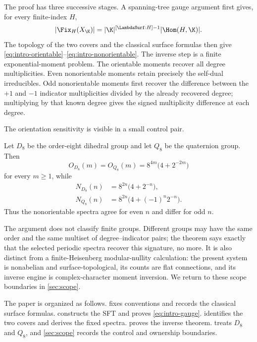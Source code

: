 The proof has three successive stages.  A spanning-tree gauge argument first
gives, for every finite-index $H$,
\begin{equation}
 |\Fix_H(X_{\K})|
 =|\K|^{[\LambdaSurf:H]-1}|\Hom(H,\K)|.
 \label{eq:intro-gauge}
\end{equation}
The topology of the two covers and the classical surface formulas then give
\eqref{eq:intro-orientable}--\eqref{eq:intro-nonorientable}.  The inverse step
is a finite exponential-moment problem.  The orientable moments recover all
degree multiplicities.  Even nonorientable moments retain precisely the
self-dual irreducibles.  Odd nonorientable moments first recover the difference
between the $+1$ and $-1$ indicator multiplicities divided by the already
recovered degree; multiplying by that known degree gives the signed
multiplicity difference at each degree.

The orientation sensitivity is visible in a small control pair.

\begin{corollary}
\label{cor:d8q8-intro}
Let $D_8$ be the order-eight dihedral group and let $Q_8$ be the quaternion
group.  Then
\[
 O_{D_8}(m)=O_{Q_8}(m)
 =8^{4m}\bigl(4+2^{-2m}\bigr)
\]
for every $m\geq1$, while
\[
 \begin{aligned}
 N_{D_8}(n)&=8^{2n}\bigl(4+2^{-n}\bigr),\\
 N_{Q_8}(n)&=8^{2n}\bigl(4+(-1)^n2^{-n}\bigr).
 \end{aligned}
\]
Thus the nonorientable spectra agree for even $n$ and differ for odd $n$.
\end{corollary}

The argument does not classify finite groups.  Different groups may have the
same order and the same multiset of degree--indicator pairs; the theorem says
exactly that the selected periodic spectra recover this signature, no more.
It is also distinct from a finite-Heisenberg modular-nullity calculation: the
present system is nonabelian and surface-topological, its counts are flat
connections, and its inverse engine is complex-character moment inversion.
We return to these scope boundaries in \cref{sec:scope}.

The paper is organized as follows.   fixes conventions
and records the classical surface formulas.   constructs
the SFT and proves \eqref{eq:intro-gauge}.  
identifies the two covers and derives the fixed spectra.
 proves the inverse theorem.
 treats $D_8$ and $Q_8$, and \cref{sec:scope} records the
control and ownership boundaries.
